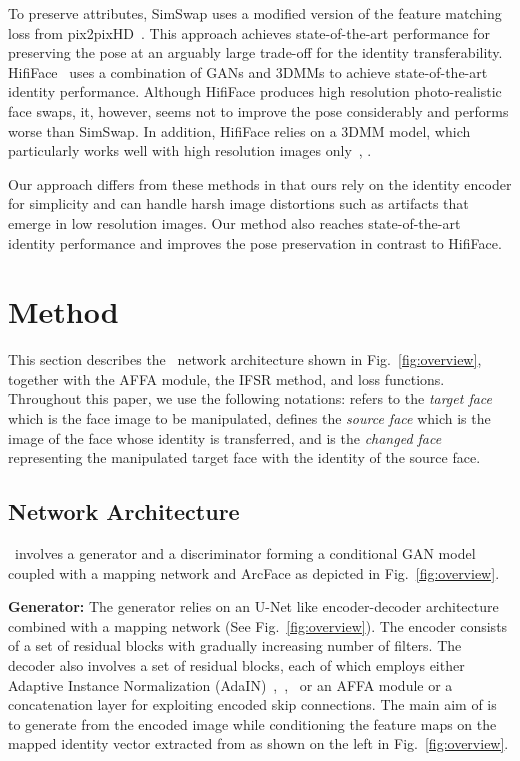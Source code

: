 \documentclass[10pt,twocolumn,letterpaper]{article}
\newcommand{\fti}[1]{\textit{FaceDancer}{#1}}
\begin{document}
To preserve attributes, SimSwap uses a modified version of the feature matching loss from pix2pixHD~\cite{pix2pixhd}.
This approach achieves state-of-the-art performance for preserving the pose at an arguably large trade-off for the identity transferability. 
HifiFace~\cite{hififace} uses a combination of GANs and 3DMMs to achieve state-of-the-art identity performance.
Although HifiFace  produces high resolution photo-realistic face swaps, it, however, seems  not to improve the pose considerably and performs  worse than SimSwap. In addition, HifiFace relies on a 3DMM model, which particularly works well with high resolution images only~\cite{3dmmlowres}, \cite{3dmm}. 
 
Our approach differs from these methods in that ours rely on the identity encoder for simplicity and can handle harsh image distortions such as artifacts that emerge in low resolution images. Our method also reaches   state-of-the-art identity performance and improves the pose preservation in contrast to HifiFace.






\section{Method}
\label{s:method}

This section  describes the \fti~network architecture  shown in Fig.~\ref{fig:overview}, together with the AFFA module, the IFSR method, and loss functions. 
Throughout this paper, we use the following notations:  refers to the \textit{target face} which is the face image to be manipulated,  defines   the \textit{source face} which is the image of the face whose identity is transferred, and  is the \textit{changed face} representing the manipulated target face with the identity of the source face.



\subsection{Network Architecture}
\label{ss:netarchitecture}

\fti~involves a generator and a discriminator forming a conditional GAN model coupled with a mapping network and ArcFace \cite{arcface} as depicted in Fig.~\ref{fig:overview}. 

\textbf{Generator:} The generator  relies on an U-Net like encoder-decoder architecture combined with  a mapping network  (See Fig.~\ref{fig:overview}). The encoder consists of a  set of residual blocks with gradually increasing number of filters. The decoder also involves a set of residual blocks, each of which employs either Adaptive Instance Normalization (AdaIN)~\cite{styletransfer},~\cite{stylegan},~\cite{simswap} or an AFFA module or a concatenation layer for exploiting encoded skip connections.
The main aim of  is to generate  from the encoded image   while 
conditioning the feature maps on the mapped identity vector   extracted from  as shown on the left in Fig.~\ref{fig:overview}. 
\end{document}
